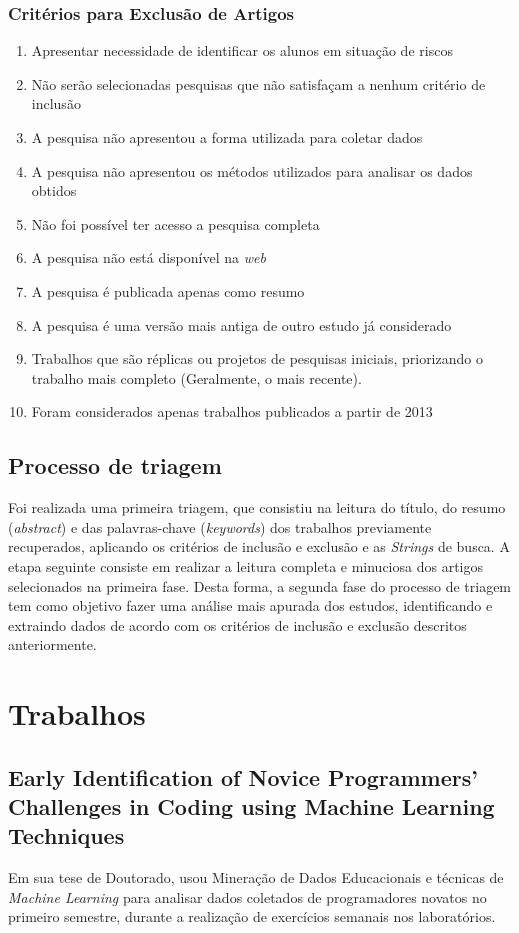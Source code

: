 \documentclass[
	12pt,				%
	openright,			%
	oneside,
	a4paper,			%
	english,			%
	french,				%
	spanish,			%
	brazil,				%
	]{abntex2}
\begin{document}
\subsubsection{Critérios para Exclusão de Artigos}
\begin{enumerate}
    \item Apresentar necessidade de identificar os alunos em situação de riscos
    \item Não serão selecionadas pesquisas que não satisfaçam a nenhum critério de inclusão
    \item A pesquisa não apresentou a forma utilizada para coletar dados
    \item A pesquisa não apresentou os métodos utilizados para analisar os dados obtidos
    \item Não foi possível ter acesso a pesquisa completa
    \item A pesquisa não está disponível na \textit{web}
    \item A pesquisa é publicada apenas como resumo
    \item A pesquisa é uma versão mais antiga de outro estudo já considerado
    \item Trabalhos que são réplicas ou projetos de pesquisas iniciais, priorizando o trabalho mais completo (Geralmente, o mais recente).
    \item Foram considerados apenas trabalhos publicados a partir de 2013
\end{enumerate}

\subsection{Processo de triagem}
Foi realizada uma primeira triagem, que consistiu na leitura do título, do resumo (\textit{abstract}) e das palavras-chave (\textit{keywords}) dos trabalhos previamente recuperados, aplicando os critérios de inclusão e exclusão e as \textit{Strings} de busca.
A etapa seguinte consiste em  realizar a leitura completa e minuciosa dos artigos selecionados na primeira fase. Desta forma, a segunda fase do processo de triagem tem como objetivo fazer uma análise mais apurada dos estudos, identificando e extraindo dados de acordo com os critérios de inclusão e exclusão descritos anteriormente.

\section{Trabalhos}
\subsection{Early Identification of Novice Programmers' Challenges in Coding using Machine Learning Techniques}
\label{sec:Early}
Em sua tese de Doutorado,  usou Mineração de Dados Educacionais e técnicas de \textit{Machine Learning} para analisar dados coletados de programadores novatos no primeiro semestre, durante a realização de exercícios semanais nos laboratórios.
\end{document}
